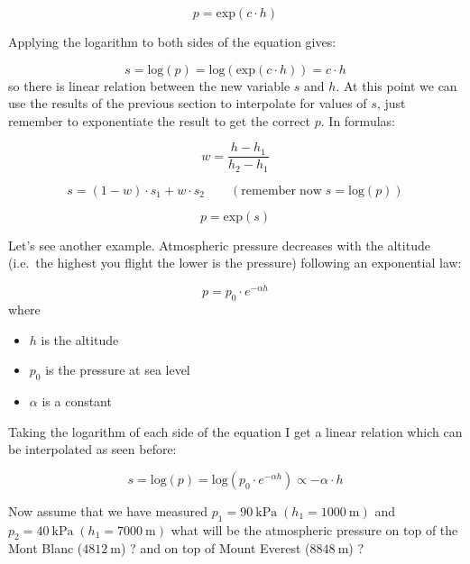 \[p = \mathrm{exp}(c \cdot h)\]

Applying the logarithm to both sides of the equation gives:

\[s = \mathrm{log}(p) = \mathrm{log}(\mathrm{exp}(c \cdot h)) = c \cdot h\]
so there is linear relation between the new variable $s$ and $h$. At this point we can use the results of the previous section to interpolate for values of $s$, just remember to exponentiate the result to get the correct $p$. In formulas:

\[w = \frac{h - h_1}{h_2 - h_1}\]

\[s = (1 - w)\cdot s_1 + w \cdot s_2\qquad (\mathrm{remember \;now }\;s = \mathrm{log}(p))\]

\[p = \mathrm{exp}(s)\]

Let's see another example. Atmospheric pressure decreases with the altitude (i.e.~the highest you flight the lower is the pressure) following an exponential law:

\[p = p_0\cdot e^{-\alpha h}\]
where
\begin{itemize}
\tightlist
\item
  \(h\) is the altitude
\item
  \(p_0\) is the pressure at sea level
\item
  \(\alpha\) is a constant
\end{itemize}

Taking the logarithm of each side of the equation I get a linear relation which can be interpolated as seen before:

\[s = \mathrm{log}(p) = \mathrm{log}(p_0\cdot e^{-\alpha h})\propto - \alpha \cdot h\]

Now assume that we have measured
\(p_1 = 90~\mathrm{kPa}\;(h_1 = 1000~\mathrm{m})\) and
\(p_2 = 40~\mathrm{kPa}\;(h_1 = 7000~\mathrm{m})\) what will be the
atmospheric pressure on top of the Mont Blanc (\(4812~\mathrm{m}\)) ? and on top of Mount Everest (\(8848~\mathrm{m}\)) ?

